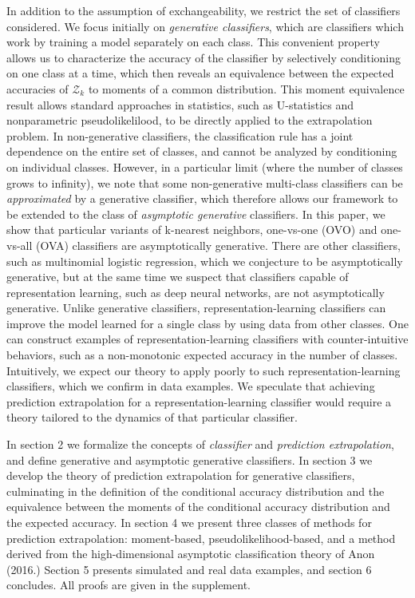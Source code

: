 \documentclass{article}
\begin{document}
In addition to the assumption of exchangeability, we restrict the set of classifiers considered.
We focus initially on \emph{generative classifiers}, which are classifiers which work by training
a model separately on each class.  This convenient property 
allows us to characterize the accuracy of the classifier by selectively conditioning on one class at a time,
which then reveals an equivalence between 
the expected accuracies of $\mathcal{Z}_k$ to moments of a common distribution.
This moment equivalence result allows standard approaches in statistics, such as U-statistics and
nonparametric pseudolikelilood, to be directly applied to the extrapolation problem.
In non-generative classifiers, the classification rule has a joint dependence on the entire set of classes,
and cannot be analyzed by conditioning on individual classes.
However, in a particular limit (where the number of classes grows to infinity), we note that
some non-generative multi-class classifiers can
be \emph{approximated} by a generative classifier, which therefore allows our framework
to be extended to the class of \emph{asymptotic generative} classifiers.
In this paper, we show that particular variants of k-nearest neighbors, one-vs-one (OVO) and one-vs-all (OVA) classifiers
are asymptotically generative.  There are other classifiers, such as multinomial logistic regression, which
we conjecture to be asymptotically generative, but at the same time we suspect that classifiers capable of representation learning, such as deep neural networks, are not asymptotically generative.  
Unlike generative classifiers, representation-learning classifiers can improve the model learned for a single class by using data from other classes.  One can construct examples of representation-learning classifiers with counter-intuitive behaviors, such 
as a non-monotonic expected accuracy in the number of classes.  Intuitively,
we expect our theory to apply poorly to such representation-learning classifiers,
which we confirm in data examples.  We speculate that achieving prediction extrapolation
for a representation-learning classifier would require a theory tailored to the dynamics of that particular classifier.

In section 2 we formalize the concepts of \emph{classifier} and \emph{prediction extrapolation},
and define generative and asymptotic generative classifiers.  In section 3 we develop the theory of prediction
extrapolation for generative classifiers, culminating in the definition of the conditional accuracy distribution
and the equivalence between the moments of the conditional accuracy distribution and the expected accuracy.
In section 4 we present three classes of methods for prediction extrapolation:
moment-based, pseudolikelihood-based, and a method derived from the high-dimensional asymptotic 
classification theory of Anon (2016.)  Section 5 presents simulated and real data examples, and section 6 concludes.
All proofs are given in the supplement.
\end{document}
